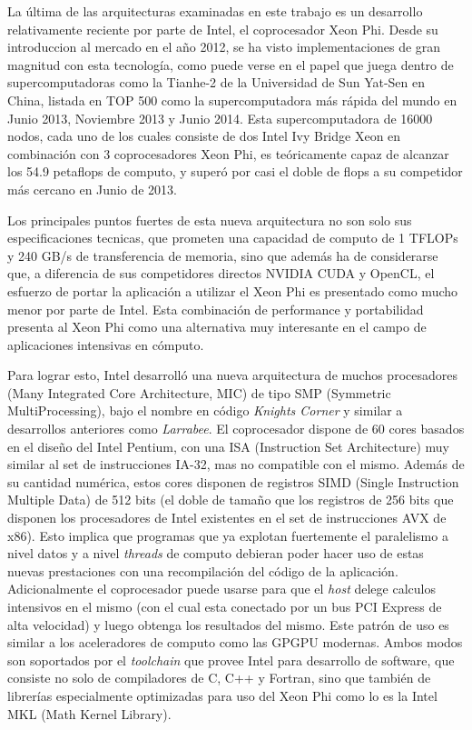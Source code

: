 La última de las arquitecturas examinadas en este trabajo es un desarrollo relativamente reciente
por parte de Intel, el coprocesador Xeon Phi. Desde su introduccion al mercado en el a\~no 2012, se ha visto implementaciones de gran magnitud con esta tecnología, como puede verse en el papel
que juega dentro de supercomputadoras como la Tianhe-2 de la Universidad de Sun Yat-Sen en China,
listada en TOP 500 como la supercomputadora más rápida del mundo en Junio 2013, Noviembre 2013 y
Junio 2014. Esta supercomputadora de 16000 nodos, cada uno de los cuales consiste de dos Intel
Ivy Bridge Xeon en combinación con 3 coprocesadores Xeon Phi, es teóricamente capaz de alcanzar los
54.9 petaflops de computo, y superó por casi el doble de flops a su competidor más cercano en
Junio de 2013.

Los principales puntos fuertes de esta nueva arquitectura no son solo sus especificaciones tecnicas, que prometen una
capacidad de computo de 1 TFLOPs y 240 GB/s de transferencia de memoria, sino que además ha de considerarse
que, a diferencia de sus competidores directos NVIDIA CUDA y OpenCL, el esfuerzo de portar la aplicación a utilizar
el Xeon Phi es presentado como mucho menor por parte de Intel. Esta combinación de performance y portabilidad
presenta al Xeon Phi como una alternativa muy interesante en el campo de aplicaciones intensivas en cómputo.

Para lograr esto, Intel desarroll\'o una nueva arquitectura de muchos procesadores (Many Integrated Core Architecture, MIC) de
tipo SMP (Symmetric MultiProcessing), bajo el nombre en código \textit{Knights Corner} y similar a desarrollos anteriores como \textit{Larrabee}. El coprocesador dispone de 60 cores basados
en el dise\~no del Intel Pentium, con una ISA (Instruction Set Architecture) muy similar al set de instrucciones IA-32, mas no compatible con el mismo. Además de su cantidad
numérica, estos cores disponen de registros SIMD (Single Instruction Multiple Data) de 512 bits (el doble de tamaño que los registros de 256
bits que disponen los procesadores de Intel existentes en el set de instrucciones AVX de x86). Esto implica que programas
que ya explotan fuertemente el paralelismo a nivel datos y a nivel \textit{threads} de computo debieran poder hacer uso de
estas nuevas prestaciones con una recompilación del c\'odigo de la aplicaci\'on. Adicionalmente el coprocesador puede usarse para que el
\textit{host} delege calculos intensivos en el mismo (con el cual esta conectado por un bus
PCI Express de alta velocidad) y luego obtenga los resultados del mismo. Este patr\'on de uso es similar a los aceleradores de computo como las GPGPU modernas. Ambos modos son soportados por el \textit{toolchain} que provee
Intel para desarrollo de software, que consiste no solo de compiladores de C, C++ y Fortran, sino que también de librerías especialmente optimizadas para uso del Xeon Phi
como lo es la Intel MKL (Math Kernel Library).

